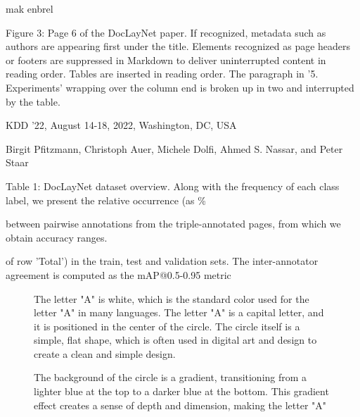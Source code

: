 \documentclass[11pt,a4paper]{article}
\begin{document}
mak enbrel

Figure 3: Page 6 of the DocLayNet paper. If recognized, metadata such as authors are appearing first under the title. Elements recognized as page headers or footers are suppressed in Markdown to deliver uninterrupted content in reading order. Tables are inserted in reading order. The paragraph in '5. Experiments' wrapping over the column end is broken up in two and interrupted by the table.

KDD '22, August 14-18, 2022, Washington, DC, USA

Birgit Pfitzmann, Christoph Auer, Michele Dolfi, Ahmed S. Nassar, and Peter Staar

Table 1: DocLayNet dataset overview. Along with the frequency of each class label, we present the relative occurrence (as \%

between pairwise annotations from the triple-annotated pages, from which we obtain accuracy ranges.

of row 'Total') in the train, test and validation sets. The inter-annotator agreement is computed as the mAP@0.5-0.95 metric

\begin{figure}[h]

The letter "A" is white, which is the standard color used for the letter "A" in many languages. The letter "A" is a capital letter, and it is positioned in the center of the circle. The circle itself is a simple, flat shape, which is often used in digital art and design to create a clean and simple design.

The background of the circle is a gradient, transitioning from a lighter blue at the top to a darker blue at the bottom. This gradient effect creates a sense of depth and dimension, making the letter "A"
\end{figure}

\begin{figure}[h]
\end{figure}
\end{document}
